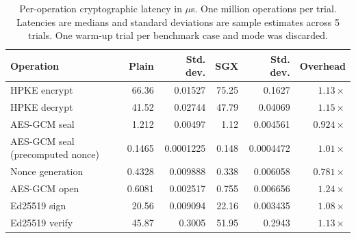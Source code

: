 \begin{table}
\centering
\small
\setlength{\tabcolsep}{4pt}
\begin{tabular}{lrrrrr}
\toprule
Operation & Plain & Std. dev. & SGX & Std. dev. & Overhead \\
\midrule
HPKE encrypt & 66.36 & 0.01527 & 75.25 & 0.1627 & $1.13\times$ \\
HPKE decrypt & 41.52 & 0.02744 & 47.79 & 0.04069 & $1.15\times$ \\
AES-GCM seal & 1.212 & 0.00497 & 1.12 & 0.004561 & $0.924\times$ \\
\quad AES-GCM seal (precomputed nonce) & 0.1465 & 0.0001225 & 0.148 & 0.0004472 & $1.01\times$ \\
\quad Nonce generation & 0.4328 & 0.009888 & 0.338 & 0.006058 & $0.781\times$ \\
AES-GCM open & 0.6081 & 0.002517 & 0.755 & 0.006656 & $1.24\times$ \\
Ed25519 sign & 20.56 & 0.009094 & 22.16 & 0.003435 & $1.08\times$ \\
Ed25519 verify & 45.87 & 0.3005 & 51.95 & 0.2943 & $1.13\times$ \\
\bottomrule
\end{tabular}
\caption{Per-operation cryptographic latency in ${}\mu$s. One million operations per trial. Latencies are medians and standard deviations are sample estimates across 5 trials. One warm-up trial per benchmark case and mode was discarded.}
\label{tab:reproduction-table4-1m}
\end{table}
